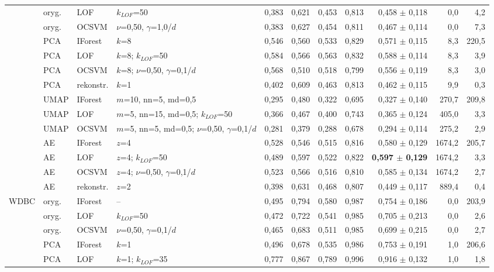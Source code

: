 \begin{longtable}{lllL{2.7cm}rrrrrrr}
 & oryg. & LOF & $k_{LOF}$=50 & 0,383 & 0,621 & 0,453 & 0,813 & 0,458 $\pm$ 0,118 & 0,0 & 4,2 \\
 & oryg. & OCSVM & $\nu$=0,50, $\gamma$=1,0/$d$ & 0,383 & 0,627 & 0,454 & 0,811 & 0,467 $\pm$ 0,114 & 0,0 & 7,3 \\
 & PCA & IForest & $k$=8 & 0,546 & 0,560 & 0,533 & 0,829 & 0,571 $\pm$ 0,115 & 8,3 & 220,5 \\
 & PCA & LOF & $k$=8; $k_{LOF}$=50 & 0,584 & 0,566 & 0,563 & 0,832 & 0,588 $\pm$ 0,114 & 8,3 & 3,9 \\
 & PCA & OCSVM & $k$=8; $\nu$=0,50, $\gamma$=0,1/$d$ & 0,568 & 0,510 & 0,518 & 0,799 & 0,556 $\pm$ 0,119 & 8,3 & 3,0 \\
 & PCA & rekonstr. & $k$=1 & 0,402 & 0,609 & 0,463 & 0,813 & 0,462 $\pm$ 0,115 & 9,9 & 0,3 \\
 & UMAP & IForest & $m$=10, nn=5, md=0,5 & 0,295 & 0,480 & 0,322 & 0,695 & 0,327 $\pm$ 0,140 & 270,7 & 209,8 \\
 & UMAP & LOF & $m$=5, nn=15, md=0,5; $k_{LOF}$=50 & 0,366 & 0,467 & 0,400 & 0,743 & 0,365 $\pm$ 0,124 & 405,0 & 3,3 \\
 & UMAP & OCSVM & $m$=5, nn=5, md=0,5; $\nu$=0,50, $\gamma$=0,1/$d$ & 0,281 & 0,379 & 0,288 & 0,678 & 0,294 $\pm$ 0,114 & 275,2 & 2,9 \\
 & AE & IForest & $z$=4 & 0,528 & 0,546 & 0,515 & 0,816 & 0,580 $\pm$ 0,129 & 1674,2 & 205,7 \\
 & AE & LOF & $z$=4; $k_{LOF}$=50 & 0,489 & 0,597 & 0,522 & 0,822 & \textbf{0,597 $\pm$ 0,129} & 1674,2 & 3,3 \\
 & AE & OCSVM & $z$=4; $\nu$=0,50, $\gamma$=0,1/$d$ & 0,523 & 0,566 & 0,516 & 0,810 & 0,585 $\pm$ 0,134 & 1674,2 & 2,7 \\
 & AE & rekonstr. & $z$=2 & 0,398 & 0,631 & 0,468 & 0,807 & 0,449 $\pm$ 0,117 & 889,4 & 0,4 \\
\midrule
WDBC & oryg. & IForest & -- & 0,495 & 0,794 & 0,580 & 0,987 & 0,754 $\pm$ 0,186 & 0,0 & 203,9 \\
 & oryg. & LOF & $k_{LOF}$=50 & 0,472 & 0,722 & 0,541 & 0,985 & 0,705 $\pm$ 0,213 & 0,0 & 2,6 \\
 & oryg. & OCSVM & $\nu$=0,50, $\gamma$=0,1/$d$ & 0,465 & 0,683 & 0,511 & 0,985 & 0,699 $\pm$ 0,215 & 0,0 & 2,7 \\
 & PCA & IForest & $k$=1 & 0,496 & 0,678 & 0,535 & 0,986 & 0,753 $\pm$ 0,191 & 1,0 & 206,6 \\
 & PCA & LOF & $k$=1; $k_{LOF}$=35 & 0,777 & 0,867 & 0,789 & 0,996 & 0,916 $\pm$ 0,132 & 1,0 & 1,8 \\

\end{longtable}
